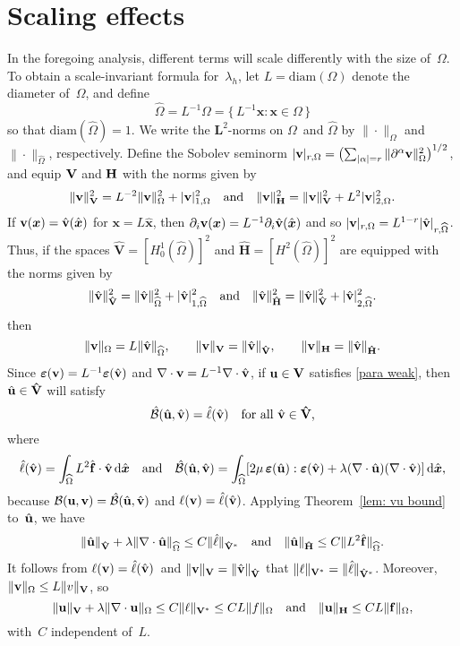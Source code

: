 \documentclass[11pt]{article}
\newcommand{\calB}{\mathcal{B}}
\newcommand{\calBhat}{\hat{\mathcal{B}}}
\newcommand{\vf}{{\bf f}}
\newcommand{\vu}{{\bf u}}
\newcommand{\vv}{{\bf v}}
\newcommand{\vV}{{\bf V}}
\newcommand{\vH}{{\bf H}}
\newcommand{\vVhat}{\mathbf{\hat V}}
\newcommand{\vHhat}{\mathbf{\hat H}}
\newcommand{\bsx}{{\boldsymbol{x}}}
\numberwithin{equation}{section}
\newcommand{\veps}{{\boldsymbol{\varepsilon}}}
\newcommand{\ud}{\mathrm{d}}
\newcommand{\diam}{\mathrm{diam}}
\begin{document}
\section{Scaling effects}
In the foregoing analysis, different terms will scale differently with the size
of~$\Omega$.  To obtain a scale-invariant formula for~$\lambda_h$, let
$L=\diam(\Omega)$ denote the diameter of~$\Omega$,
and define
\[
\widehat\Omega=L^{-1}\Omega=\{\,L^{-1}\bsx:\bsx\in\Omega\,\}
\]
so that $\diam(\widehat\Omega)=1$.  We write the $\mathbf{L}^2$-norms on
$\Omega$~and $\widehat\Omega$ by $\|\cdot\|_\Omega$ and
$\|\cdot\|_{\widehat\Omega}$, respectively. Define the Sobolev seminorm
$|\vv|_{r,\Omega}=\bigl(\sum_{|\alpha|=r}
\|\partial^\alpha\vv\|_{\Omega}^2\bigr)^{1/2}$,
and equip $\vV$ and $\vH$ with the norms given by
\begin{equation}\label{eq: V H norms}
\|\vv\|_{\vV}^2=L^{-2}\|\vv\|_\Omega^2+|\vv|_{1,\Omega}^2
\quad\text{and}\quad
\|\vv\|_{\vH}^2=\|\vv\|_{\vV}^2+L^2|\vv|_{2,\Omega}^2.
\end{equation}
If $\vv(\bsx)=\hat\vv(\hat\bsx)$ for $\bsx=L\hat\bsx$, then
$\partial_i\vv(\bsx)=L^{-1}\partial_i\hat\vv(\hat\bsx)$ and so
$|\vv|_{r,\Omega}=L^{1-r}|\hat\vv|_{r,\widehat\Omega}$.  Thus, if the spaces
$\vVhat=[H^1_0(\widehat\Omega)]^2$ and $\vHhat=[H^2(\widehat\Omega)]^2$ are
equipped with the norms given by
\[
\|\hat\vv\|_{\vVhat}^2=\|\hat\vv\|_{\widehat\Omega}^2
    +|\hat\vv|_{1,\widehat\Omega}^2
\quad\text{and}\quad
\|\hat\vv\|_{\vHhat}^2=\|\hat\vv\|_{\vVhat}^2
    +|\hat\vv|_{2,\widehat\Omega}^2.
\]
then
\[
\|\vv\|_\Omega=L\|\hat\vv\|_{\widehat\Omega},\qquad
\|\vv\|_{\vV}=\|\hat\vv\|_{\vVhat},\qquad
\|\vv\|_{\mathbf{H}}=\|\hat\vv\|_{\vHhat}.
\]
Since $\veps(\vv)=L^{-1}\veps(\hat\vv)$ and
$\nabla\cdot\vv=L^{-1}\nabla\cdot\hat\vv$,
if $\vu\in\vV$ satisfies \eqref{para weak}, then $\hat\vu\in\vVhat$ will
satisfy
\[
\calBhat(\hat\vu,\hat\vv)=\hat\ell(\hat\vv)
\quad\text{for all $\hat\vv\in\vVhat$,}
\]
where
\[
\hat\ell(\hat\vv) = \int_{\widehat\Omega}L^2\hat\vf\cdot\hat\vv\,\ud\hat\bsx
\quad\text{and}\quad
\calBhat(\hat\vu,\hat\vv)=\int_{\widehat\Omega}
[2\mu\,\veps(\hat\vu):\veps(\hat\vv)+\lambda(\nabla\cdot\hat\vu)
    (\nabla\cdot\hat\vv)]\,\ud\hat\bsx,
\]
because $\calB(\vu,\vv)=\calBhat(\hat\vu,\hat\vv)$ and
$\ell(\vv)=\hat\ell(\hat\vv)$. Applying Theorem~\ref{lem: vu bound}
to~$\hat\vu$, we have
\[
\|\hat\vu\|_{\vVhat}+\lambda\|\nabla\cdot\hat\vu\|_{\widehat\Omega}
    \le C\|\hat\ell\|_{\vVhat^*}
\quad\text{and}\quad
\|\hat\vu\|_{\vHhat}\le C\|L^2\hat\vf\|_{\widehat\Omega}.
\]
It follows from $\ell(\vv)=\hat\ell(\hat\vv)$~and
$\|\vv\|_{\vV}=\|\hat\vv\|_{\vVhat}$ that
$\|\ell\|_{\vV^*}=\|\hat\ell\|_{\vVhat^*}$.  Moreover,
$\|\vv\|_\Omega\le L\|v\|_{\vV}$, so
\[
\|\vu\|_{\vV}+\lambda\|\nabla\cdot\vu\|_\Omega\le C\|\ell\|_{\vV^*}
\le CL\|f\|_\Omega
\quad\text{and}\quad
\|\vu\|_{\vH}\le CL\|\vf\|_\Omega,
\]
with~$C$ independent of~$L$.
\end{document}
